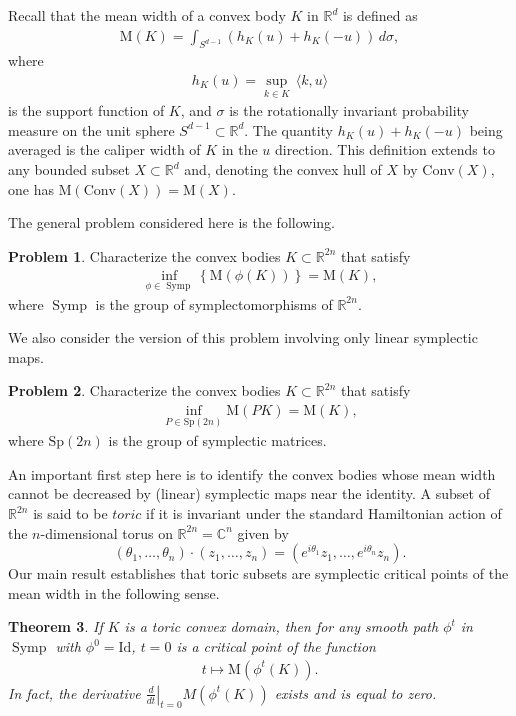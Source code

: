 \documentclass[12pt]{amsart}
\newtheorem{theorem}{Theorem}[section]
\theoremstyle{definition}
\newtheorem{problem}[theorem]{Problem}
\newcommand\Symp{\operatorname{Symp}}
\newcommand{\CC}{{\mathbb C}}
\newcommand{\RR}{{\mathbb R}}
\newcommand{\mw}{{{\mathrm {M}}}}
\newcommand{\C}{{\mathrm{Conv}}}
\begin{document}
Recall that the mean width of a convex body $K$ in $\RR^{d}$ is defined as
\begin{align*}
    \mw (K) =\int_{S^{d-1}}(h_K(u)+h_K(-u))\, d \sigma,
\end{align*}
where
\begin{align*}
    h_K (u) =\sup_{k \in K} \, \langle k,u \rangle
\end{align*}
is the {support function} of $K$, and $\sigma$ is the rotationally invariant probability measure on the unit sphere  $S^{d-1} \subset \RR^d$. The quantity $h_K(u)+h_K(-u)$ being averaged is the caliper width of $K$ in the $u$ direction. This definition extends to any bounded subset $X \subset \RR^d$ and, denoting the convex hull of $X$ by $\C(X)$, one has $\mw(\C(X)) = \mw(X)$.

The general problem considered here is the following.
\begin{problem}\label{pr2}
Characterize the convex bodies $K \subset \RR^{2n}$ that satisfy
\begin{align}\label{p3}
  \inf_{\phi \in \Symp} \left\{\mw (\phi (K))\right\} =\mw (K),
\end{align}
where $\Symp$ is the group of symplectomorphisms of $\RR^{2n}$.
\end{problem}
We also consider the version of this problem involving only linear symplectic maps.
\begin{problem}\label{pr1}
Characterize  the convex bodies $K \subset \RR^{2n}$ that satisfy
\begin{align}\label{p1}
  \inf_{P \in \mathrm{Sp}
(2n)} \mw (PK)  = \mw (K),
\end{align}
where $\mathrm{Sp}(2n)$ is the group of symplectic matrices.
\end{problem}

An important first step here is to identify the convex bodies whose mean width cannot be decreased by (linear) symplectic maps near the identity. A subset of $\RR^{2n}$ is said to be $\mathit{toric}$ if it is invariant under the standard Hamiltonian action of the $n$-dimensional torus on $\RR^{2n} =\CC^n$ given by
$$(\theta_1, \dots, \theta_n) \cdot (z_1, \dots,z_n) = \left(e^{i\theta_1}z_1, \dots, e^{i \theta_n} z_n\right).$$
Our main result establishes that toric subsets are symplectic critical points of the mean width in the following sense.

\begin{theorem}\label{variation}
If $K$ is a toric convex domain, then for any smooth path $\phi^t$ in $\Symp$ with $\phi^0 = \mathrm{Id}$, $t=0$ is a critical point of the function
\begin{align*}
   t \mapsto \mw(\phi^t(K)).
\end{align*}
In fact, the derivative $\left.\frac{d}{dt}\right|_{t=0} M(\phi^t(K))$
 exists and is equal to zero.
\end{theorem}
\end{document}
